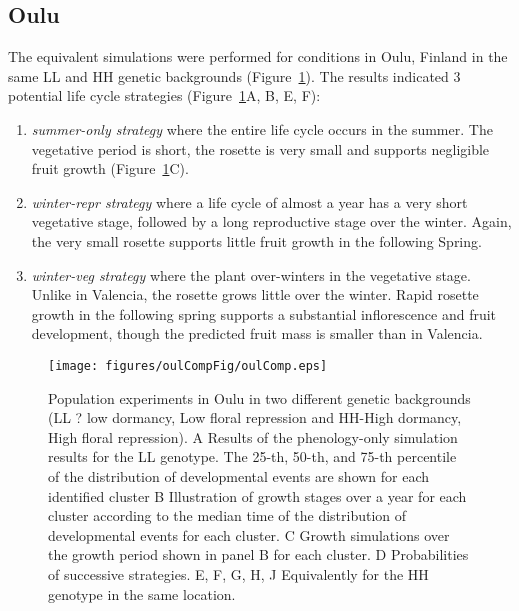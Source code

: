 \subsection{Oulu}
\label{oulu}
The equivalent simulations were performed for conditions in Oulu,
Finland in the same LL and HH genetic backgrounds (Figure~\ref{fig:oulComp}). The
results indicated 3 potential life cycle strategies (Figure~\ref{fig:oulComp}A, B, E,
F):

\begin{enumerate}
\def\labelenumi{\arabic{enumi}.}
\item
  \emph{summer-only strategy} where the entire life cycle occurs in the
  summer. The vegetative period is short, the rosette is very small and
  supports negligible fruit growth (Figure~\ref{fig:oulComp}C).
\item
  \emph{winter-repr strategy} where a life cycle of almost a year has a
  very short vegetative stage, followed by a long reproductive stage
  over the winter. Again, the very small rosette supports little fruit
  growth in the following Spring.
\item
  \emph{winter-veg strategy} where the plant over-winters in the
  vegetative stage. Unlike in Valencia, the rosette grows little over
  the winter. Rapid rosette growth in the following spring supports a
  substantial inflorescence and fruit development, though the predicted
  fruit mass is smaller than in Valencia.
\end{enumerate}

\begin{figure}[p]
\centering
\texttt{[image: figures/oulCompFig/oulComp.eps]}
\caption{Population experiments in Oulu in two different genetic backgrounds (LL
  ? low dormancy, Low floral repression and HH-High dormancy, High floral
  repression). A Results of the phenology-only simulation results for the LL
  genotype. The 25-th, 50-th, and 75-th percentile of the distribution of
  developmental events are shown for each identified cluster B Illustration of
  growth stages over a year for each cluster according to the median time of the
  distribution of developmental events for each cluster. C Growth simulations
  over the growth period shown in panel B for each cluster.  D Probabilities of
  successive strategies. E, F, G, H, J Equivalently for the HH genotype in the
  same location.}
\label{fig:oulComp}
\end{figure}

